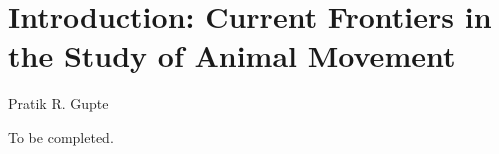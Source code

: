 
{}%
\chapter{Introduction: Current Frontiers in the Study of Animal Movement}\label{ch:introduction}

{{Pratik R. Gupte}}




To be completed.

{ \begin{center}  \end{center} }

\vfill

\clearpage
